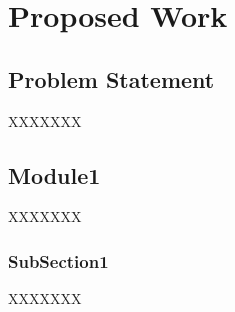 \chapter{Proposed Work}

\section{Problem Statement}
XXXXXXX

\section{Module1}
XXXXXXX
\subsection{SubSection1}
XXXXXXX